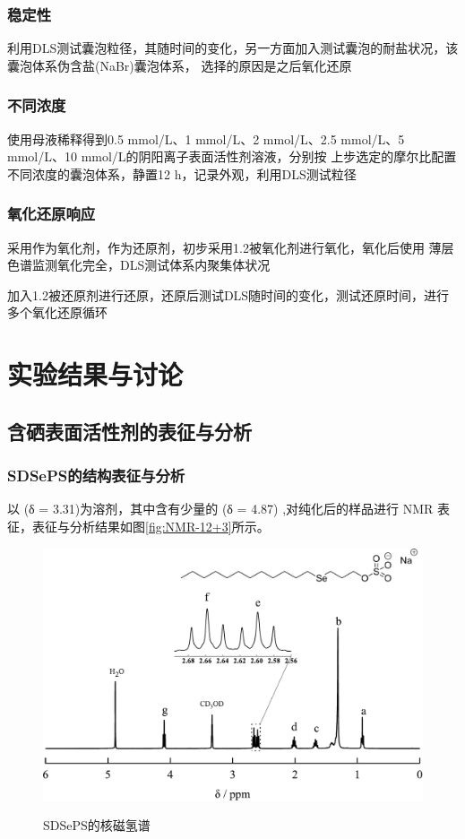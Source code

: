 \documentclass[bachelor,fandolfonts,replaceperiod]{jnuthesis}
\begin{document}
    \subsection{稳定性}
    利用DLS测试囊泡粒径，其随时间的变化，另一方面加入测试囊泡的耐盐状况，该囊泡体系伪含盐(NaBr)囊泡体系，
    选择的原因是之后氧化还原
    
    \subsection{不同浓度}
    使用母液稀释得到0.5 mmol/L、1 mmol/L、2 mmol/L、2.5 mmol/L、5 mmol/L、10 mmol/L的阴阳离子表面活性剂溶液，分别按
    上步选定的摩尔比配置不同浓度的囊泡体系，静置12 h，记录外观，利用DLS测试粒径
    
    \subsection{氧化还原响应}
    采用作为氧化剂，作为还原剂，初步采用1.2被氧化剂进行氧化，氧化后使用
    薄层色谱监测氧化完全，DLS测试体系内聚集体状况
    
    加入1.2被还原剂进行还原，还原后测试DLS随时间的变化，测试还原时间，进行多个氧化还原循环
    
    
    \chapter{实验结果与讨论}\label{chapter:results}
    \section{含硒表面活性剂的表征与分析}
    \subsection{SDSePS的结构表征与分析}
    以 (δ = 3.31)为溶剂，其中含有少量的 (δ = 4.87)\cite{babij2016nmr} ,对纯化后的样品进行
     NMR 表征，表征与分析结果如图\ref{fig:NMR-12+3}所示。
    \begin{figure}[htbp]
        \centering
        \includegraphics[width=.75\textwidth]{figure/SDSePS-nmr.pdf}\\
        \caption{SDSePS的核磁氢谱}\label{fig:SDSePS-nmr}
    \end{figure}
     
\end{document}

